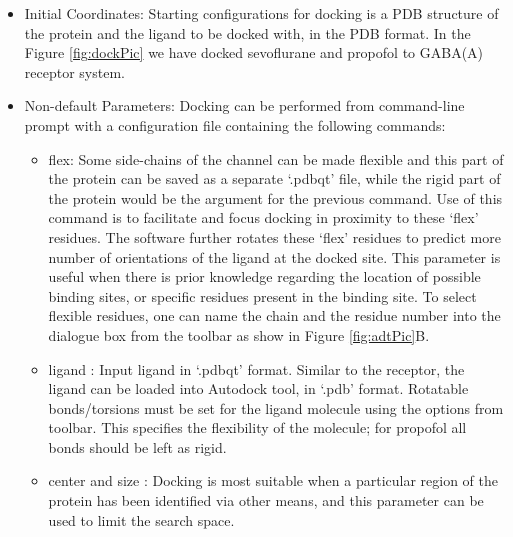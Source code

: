 \documentclass[12pt]{article}
\begin{document}
\begin{itemize}
	\item Initial Coordinates: Starting configurations for docking is a PDB structure of the protein and the ligand to be docked with, in the PDB format. In the Figure \ref{fig:dockPic} we have docked sevoflurane and propofol to GABA(A) receptor system.
	\item Non-default Parameters:  Docking can be performed from command-line prompt with a configuration file containing the following commands:
		\begin{itemize}
			\item flex: Some side-chains of the channel can be made flexible and this part of the protein can be saved as a separate `.pdbqt' file, while the rigid part of the protein would be the argument for the previous command. Use of this command is to facilitate and focus docking in proximity to these `flex' residues. The software further rotates these `flex' residues to predict more number of orientations of the ligand at the docked site. This parameter is useful when  there is  prior knowledge regarding the location of possible binding sites, or specific residues present in the binding site. To select flexible residues, one can name the chain and the residue number into the dialogue box from the toolbar as show in Figure \ref{fig:adtPic}B.
			\item ligand : Input ligand in `.pdbqt' format. Similar to the receptor, the ligand can be loaded into Autodock tool, in `.pdb' format. Rotatable bonds/torsions must be set for the ligand molecule using the options from toolbar. This specifies the flexibility of the molecule; for propofol all bonds should be left as rigid. %
			\item center and size : Docking is most suitable when a particular region of the protein has been identified via other means, and this parameter can be used to limit the search space.   %

\end{itemize}
\end{itemize}
\end{document}
